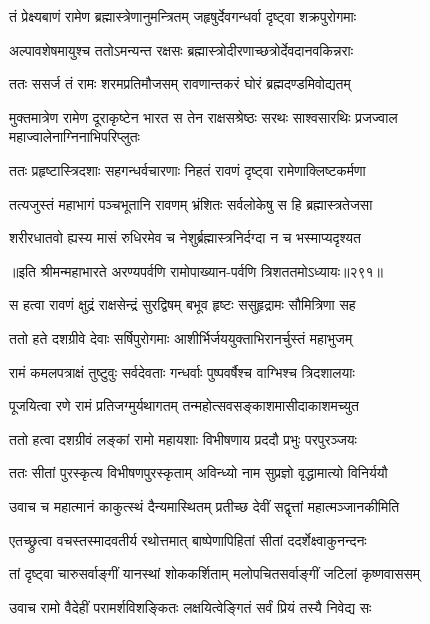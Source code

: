 \twolineshloka
{तं प्रेक्ष्यबाणं रामेण ब्रह्मास्त्रेणानुमन्त्रितम्}
{जहृषुर्देवगन्धर्वा दृष्ट्वा शक्रपुरोगमाः}


\twolineshloka
{अल्पावशेषमायुश्च ततोऽमन्यन्त रक्षसः}
{ब्रह्मास्त्रोदीरणाच्छत्रोर्देवदानवकिन्नराः}


\twolineshloka
{ततः ससर्ज तं रामः शरमप्रतिमौजसम्}
{रावणान्तकरं घोरं ब्रह्मदण्डमिवोद्यतम्}


\threelineshloka
{मुक्तमात्रेण रामेण दूराकृष्टेन भारत}
{स तेन राक्षसश्रेष्ठः सरथः साश्वसारथिः}
{प्रजज्वाल महाज्वालेनाग्निनाभिपरिप्लुतः}


\twolineshloka
{ततः प्रहृष्टास्त्रिदशाः सहगन्धर्वचारणाः}
{निहतं रावणं दृष्ट्वा रामेणाक्लिष्टकर्मणा}


\twolineshloka
{तत्यजुस्तं महाभागं पञ्चभूतानि रावणम्}
{भ्रंशितः सर्वलोकेषु स हि ब्रह्मास्त्रतेजसा}


\twolineshloka
{शरीरधातवो ह्यस्य मासं रुधिरमेव च}
{नेशुर्ब्रह्मास्त्रनिर्दग्दा न च भस्माप्यदृश्यत}


॥इति श्रीमन्महाभारते अरण्यपर्वणि रामोपाख्यान-पर्वणि त्रिशततमोऽध्यायः॥२९१॥




\twolineshloka
{स हत्वा रावणं क्षुद्रं राक्षसेन्द्रं सुरद्विषम्}
{बभूव हृष्टः ससुहृद्रामः सौमित्रिणा सह}


\twolineshloka
{ततो हते दशग्रीवे देवाः सर्षिपुरोगमाः}
{आशीर्भिर्जययुक्ताभिरानर्चुस्तं महाभुजम्}


\twolineshloka
{रामं कमलपत्राक्षं तुष्टुवुः सर्वदेवताः}
{गन्धर्वाः पुष्पवर्षैश्च वाग्भिश्च त्रिदशालयाः}


\twolineshloka
{पूजयित्वा रणे रामं प्रतिजग्मुर्यथागतम्}
{तन्महोत्सवसङ्काशमासीदाकाशमच्युत}


\twolineshloka
{ततो हत्वा दशग्रीवं लङ्कां रामो महायशाः}
{विभीषणाय प्रददौ प्रभुः परपुरञ्जयः}


\twolineshloka
{ततः सीतां पुरस्कृत्य विभीषणपुरस्कृताम्}
{अविन्ध्यो नाम सुप्रज्ञो वृद्धामात्यो विनिर्ययौ}


\twolineshloka
{उवाच च महात्मानं काकुत्स्थं दैन्यमास्थितम्}
{प्रतीच्छ देवीं सद्वृत्तां महात्मञ्जानकीमिति}


\twolineshloka
{एतच्छ्रुत्वा वचस्तस्मादवतीर्य रथोत्तमात्}
{बाष्पेणापिहितां सीतां ददर्शेक्ष्वाकुनन्दनः}


\twolineshloka
{तां दृष्ट्वा चारुसर्वाङ्गीं यानस्थां शोककर्शिताम्}
{मलोपचितसर्वाङ्गीं जटिलां कृष्णवाससम्}


\twolineshloka
{उवाच रामो वैदेहीं परामर्शविशङ्कितः}
{लक्षयित्वेङ्गितं सर्वं प्रियं तस्यै निवेद्य सः}


